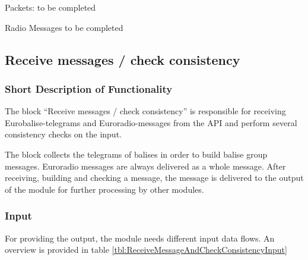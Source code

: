 \documentclass{template/openetcs_report}
\begin{document}
Packets:
to be completed

Radio Messages
to be completed
 
\subsection{Receive messages / check consistency}
\subsubsection{Short Description of Functionality}

The block ``Receive messages / check consistency'' is responsible for receiving Eurobalise-telegrams and Euroradio-messages from the API and perform several consistency checks on the input.

The block collects the telegrams of balises in order to build balise group messages. Euroradio messages are always delivered as a whole message. After receiving, building and checking a message, the message is delivered to the output of the module for further processing by other modules.


\subsubsection{Input}

For providing the output, the module needs different input data flows. An overview is provided in table \ref{tbl:ReceiveMessageAndCheckConsistencyInput}
\end{document}
